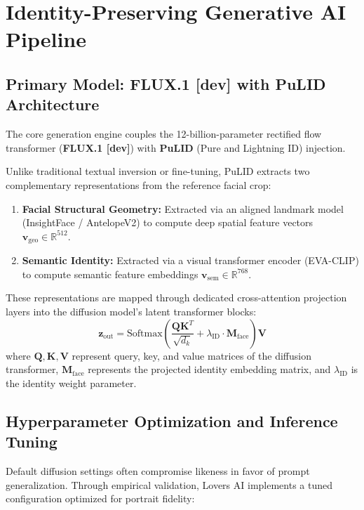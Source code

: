 \documentclass[11pt,a4paper]{article}
\begin{document}
\section{Identity-Preserving Generative AI Pipeline}

\subsection{Primary Model: FLUX.1 [dev] with PuLID Architecture}
The core generation engine couples the 12-billion-parameter rectified flow transformer (\textbf{FLUX.1 [dev]}) with \textbf{PuLID} (Pure and Lightning ID) injection. 

Unlike traditional textual inversion or fine-tuning, PuLID extracts two complementary representations from the reference facial crop:
\begin{enumerate}
    \item \textbf{Facial Structural Geometry:} Extracted via an aligned landmark model (InsightFace / AntelopeV2) to compute deep spatial feature vectors $\mathbf{v}_{\text{geo}} \in \mathbb{R}^{512}$.
    \item \textbf{Semantic Identity:} Extracted via a visual transformer encoder (EVA-CLIP) to compute semantic feature embeddings $\mathbf{v}_{\text{sem}} \in \mathbb{R}^{768}$.
\end{enumerate}

These representations are mapped through dedicated cross-attention projection layers into the diffusion model's latent transformer blocks:
\begin{equation}
    \mathbf{z}_{\text{out}} = \text{Softmax}\left(\frac{\mathbf{Q} \mathbf{K}^T}{\sqrt{d_k}} + \lambda_{\text{ID}} \cdot \mathbf{M}_{\text{face}}\right) \mathbf{V}
\end{equation}
where $\mathbf{Q}, \mathbf{K}, \mathbf{V}$ represent query, key, and value matrices of the diffusion transformer, $\mathbf{M}_{\text{face}}$ represents the projected identity embedding matrix, and $\lambda_{\text{ID}}$ is the identity weight parameter.

\subsection{Hyperparameter Optimization and Inference Tuning}
Default diffusion settings often compromise likeness in favor of prompt generalization. Through empirical validation, Lovers AI implements a tuned configuration optimized for portrait fidelity:
\end{document}
